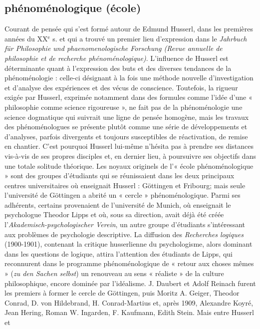 \subsection{phénoménologique (école) }
Courant de
pensée qui s’est formé autour de Edmund
Husserl, dans les premières années du
{\footnotesize XX}$^\text{e}$ s. et qui a trouvé un premier lieu
d'expression dans le {\it Jahrbuch für Philosophie
und phaenomenologische Forschung
(Revue annuelle de philosophie et de
recherche phénoménologique)}. L'influence
de Husserl est déterminante quant à l’expression
des buts et des diverses tendances
de la phénoménologie : celle-ci
désignant à la fois une méthode nouvelle
d'investigation et d’analyse des expériences
et des vécus de conscience. Toutefois,
la rigueur exigée par Husserl,
exprimée notamment dans des formules
comme l’idée d’une « philosophie comme
science rigoureuse », ne fait pas de la
phénoménologie une science dogmatique
qui suivrait une ligne de pensée homogène,
mais les travaux des phénoménologues
se présente plutôt comme une
série de développements et d'analyses,
parfois divergents et toujours susceptibles
de réactivation, de remise en chantier.
C’est pourquoi Husserl lui-même n’hésita
pas à prendre ses distances vis-à-vis de
ses propres disciples et, en dernier lieu,
à poursuivre ses objectifs dans une
totale solitude théorique. Les noyaux originels
de l'« école phénoménologique »
sont des groupes d'étudiants qui se réunissaient
dans les deux principaux
centres universitaires où enseignait Husserl :
Göttingen et Fribourg; mais seule
l’université de Göttingen a abrité un
« cercle » phénoménologique. Parmi ses
adhérents, certains provenaient de l’université
de Munich, où enseignait le psychologue
Theodor Lipps et où, sous sa
direction, avait déjà été créée l’{\it Akademisch-psychologischer
Verein}, un autre
groupe d'étudiants s'intéressant aux problèmes
de psychologie descriptive. La diffusion
des {\it Recherches logiques} (1900-1901),
contenant la critique husserlienne
du psychologisme, alors dominant dans
les questions de logique, attira l'attention
%
%
des étudiants de Lipps, qui reconnurent
dans le programme phénoménologique de
« retour aux choses mêmes » ({\it zu den
Sachen selbst}) un renouveau au sens
« réaliste » de la culture philosophique,
encore dominée par l’idéalisme. J. Daubert
et Adolf Reinach furent les premiers
à former le cercle de Göttingen, puis
Moritz A. Geiger, Theodor Conrad,
D. von Hildebrand, H. Conrad-Martius
et, après 1909, Alexandre Koyré, Jean
Hering, Roman W. Ingarden, F. Kaufmann,
Edith Stein. Mais entre Husserl et
